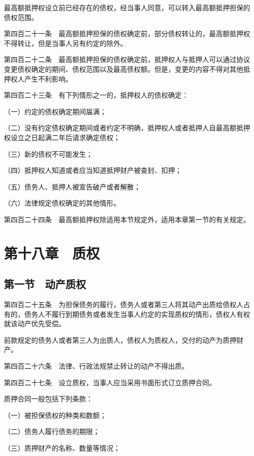 \documentclass[UTF8,12pt,a4paper]{ctexbook}
\begin{document}
最高额抵押权设立前已经存在的债权，经当事人同意，可以转入最高额抵押担保的债权范围。

第四百二十一条　最高额抵押担保的债权确定前，部分债权转让的，最高额抵押权不得转让，但是当事人另有约定的除外。

第四百二十二条　最高额抵押担保的债权确定前，抵押权人与抵押人可以通过协议变更债权确定的期间、债权范围以及最高债权额。但是，变更的内容不得对其他抵押权人产生不利影响。

第四百二十三条　有下列情形之一的，抵押权人的债权确定：

（一）约定的债权确定期间届满；

（二）没有约定债权确定期间或者约定不明确，抵押权人或者抵押人自最高额抵押权设立之日起满二年后请求确定债权；

（三）新的债权不可能发生；

（四）抵押权人知道或者应当知道抵押财产被查封、扣押；

（五）债务人、抵押人被宣告破产或者解散；

（六）法律规定债权确定的其他情形。

第四百二十四条　最高额抵押权除适用本节规定外，适用本章第一节的有关规定。

\section*{第十八章　质权}

\subsection*{第一节　动产质权}

第四百二十五条　为担保债务的履行，债务人或者第三人将其动产出质给债权人占有的，债务人不履行到期债务或者发生当事人约定的实现质权的情形，债权人有权就该动产优先受偿。

前款规定的债务人或者第三人为出质人，债权人为质权人，交付的动产为质押财产。

第四百二十六条　法律、行政法规禁止转让的动产不得出质。

第四百二十七条　设立质权，当事人应当采用书面形式订立质押合同。

质押合同一般包括下列条款：

（一）被担保债权的种类和数额；

（二）债务人履行债务的期限；

（三）质押财产的名称、数量等情况；
\end{document}
